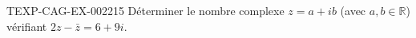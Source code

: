\begin{exercice}{TEXP-CAG-EX-002}{2}{15}
Déterminer le nombre complexe $z=a+ib$ (avec $a,b\in\mathbb{R}$) vérifiant $2z-\bar z = 6+9i$.
\end{exercice}
